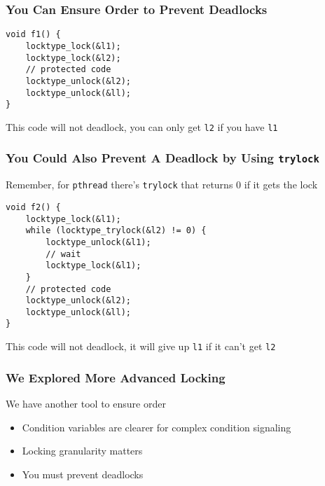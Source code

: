   \begin{frame}[fragile]
    \frametitle{You Can Ensure Order to Prevent Deadlocks}

    \begin{lstlisting}
void f1() {
    locktype_lock(&l1);
    locktype_lock(&l2);
    // protected code
    locktype_unlock(&l2);
    locktype_unlock(&ll);    
}
    \end{lstlisting}

    This code will not deadlock, you can only get {\tt l2} if you have
    {\tt l1}
  \end{frame}

  \begin{frame}[fragile]
    \frametitle{You Could Also Prevent A Deadlock by Using {\tt trylock}}

    Remember, for {\tt pthread} there's {\tt trylock} that returns 0 if it gets
    the lock

    \begin{lstlisting}
void f2() {
    locktype_lock(&l1);
    while (locktype_trylock(&l2) != 0) {
        locktype_unlock(&l1);
        // wait
        locktype_lock(&l1);
    }
    // protected code
    locktype_unlock(&l2);
    locktype_unlock(&ll);    
}
    \end{lstlisting}

    This code will not deadlock, it will give up {\tt l1} if it can't get
    {\tt l2}
  \end{frame}

  \begin{frame}
    \frametitle{We Explored More Advanced Locking}

    We have another tool to ensure order

    \begin{itemize}
      \item Condition variables are clearer for complex condition signaling
      \item Locking granularity matters
      \item You must prevent deadlocks
    \end{itemize}
  \end{frame}

